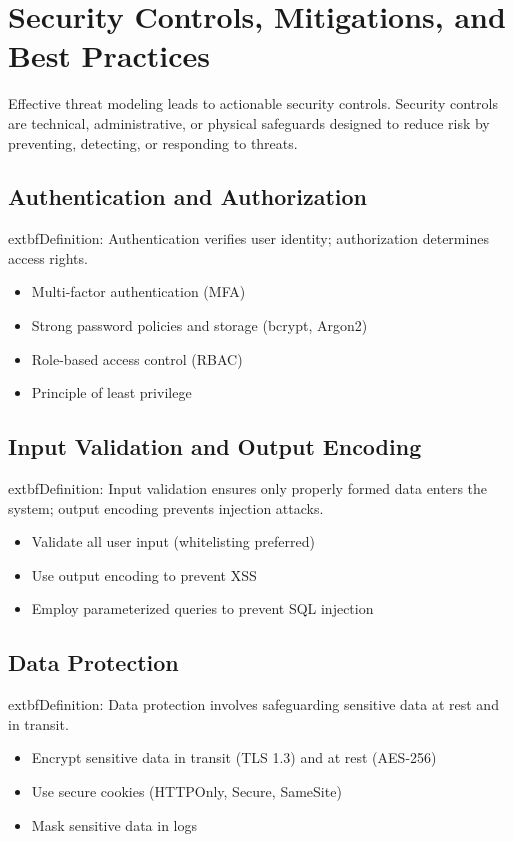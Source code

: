 
\section*{Security Controls, Mitigations, and Best Practices}
Effective threat modeling leads to actionable security controls. Security controls are technical, administrative, or physical safeguards designed to reduce risk by preventing, detecting, or responding to threats\cite{owasp,shostack2014}.

\subsection*{Authentication and Authorization}
	extbf{Definition:} Authentication verifies user identity; authorization determines access rights.\cite{owasp}
\begin{itemize}
	\item Multi-factor authentication (MFA)
	\item Strong password policies and storage (bcrypt, Argon2)
	\item Role-based access control (RBAC)
	\item Principle of least privilege
\end{itemize}

\subsection*{Input Validation and Output Encoding}
	extbf{Definition:} Input validation ensures only properly formed data enters the system; output encoding prevents injection attacks.\cite{owasp}
\begin{itemize}
	\item Validate all user input (whitelisting preferred)
	\item Use output encoding to prevent XSS
	\item Employ parameterized queries to prevent SQL injection
\end{itemize}

\subsection*{Data Protection}
	extbf{Definition:} Data protection involves safeguarding sensitive data at rest and in transit.\cite{nist800154}
\begin{itemize}
	\item Encrypt sensitive data in transit (TLS 1.3) and at rest (AES-256)
	\item Use secure cookies (HTTPOnly, Secure, SameSite)
	\item Mask sensitive data in logs
\end{itemize}

